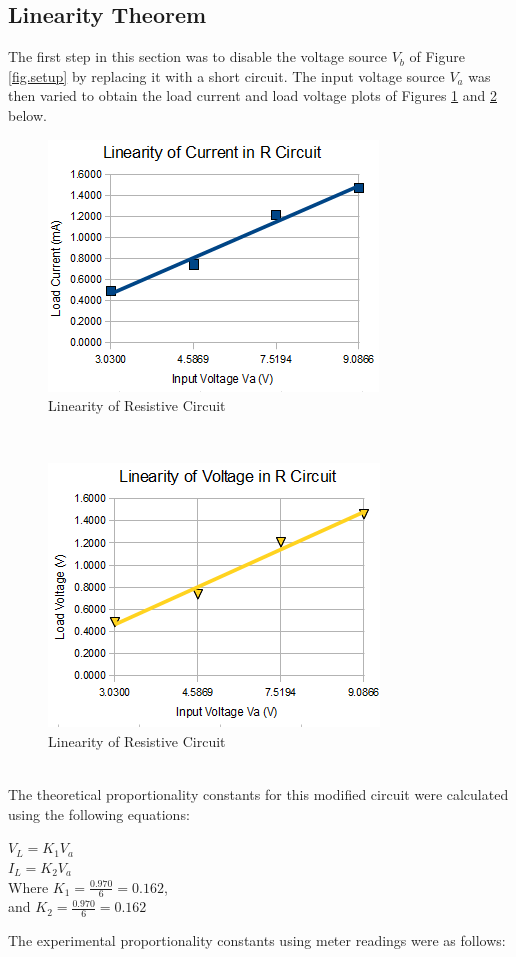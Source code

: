 \documentclass[12pt]{article}
\begin{document}
\subsection{Linearity Theorem}
The first step in this section was to disable the voltage source $ V_{b}$ of Figure \ref{fig.setup} by replacing it with a short circuit. The input voltage source $V_{a}$ was then varied to obtain the load current and load voltage plots of Figures \ref{fig.CurrentLinearity} and \ref{fig.Voltagelinearity} below.\\
\begin{figure}[htbp]
	\centering
	\includegraphics[scale=1]{CurrentLinearity.png}
	\caption{Linearity of Resistive Circuit}
	\label{fig.CurrentLinearity}
\end{figure}\\
\begin{figure}[htbp]
	\centering
	\includegraphics[scale=1]{VoltageLinearity.png}
	\caption{Linearity of Resistive Circuit}
	\label{fig.Voltagelinearity}
\end{figure}\\
\pagebreak
\vfill
The theoretical proportionality constants for this modified circuit were calculated using the following equations:
\begin{center}
	$V_{L} = K_{1}V_{a}$\\
	$I_{L} = K_{2}V_{a}$\\[1em]
	Where $K_{1} =\frac{0.970}{6} = 0.162$,\\[0.3em]
	and $K_{2} = \frac{0.970}{6} = 0.162$
\end{center}
The experimental proportionality constants using meter readings were as follows:
\end{document}
